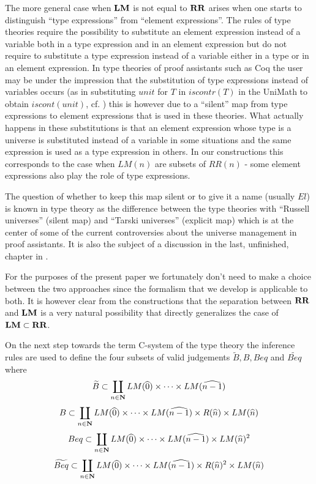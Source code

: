 \documentclass[11pt]{article}
\newcommand{\nn}{{\bf N\rm}}
\newcommand{\nat}{\nn}
\newcommand{\wt}{\widetilde}
\newcommand{\wh}{\widehat}
\newcommand{\RR}{{\bf RR}}
\newcommand{\LM}{{\bf LM}}
\begin{document}
The more general case when $\LM$ is not equal to $\RR$ arises when one starts to distinguish ``type expressions'' from ``element expressions''. The rules of type theories require the possibility to substitute an element expression instead of a variable both in a type expression and in an element expression but do not require to substitute a type expression instead of a variable either in a type or in an element expression. In type theories of proof assistants such as Coq the user may be under the impression that the substitution of type expressions instead of variables occurs (as in substituting $unit$ for $T$ in $iscontr(T)$ in the UniMath to obtain $iscont(unit)$, cf. \cite{UniMath2015}) this is however due to a ``silent'' map from type expressions to element expressions that is used in these theories. What actually happens in these substitutions is that an element expression whose type is a universe is substituted instead of a variable in some situations and the same expression is used as a type expression in others. In our constructions this corresponds to the case when $LM(n)$ are subsets of $RR(n)$ - some element expressions also play the role of type expressions. 

The question of whether to keep this map silent or to give it a name (usually $El$) is known in type theory as the difference between the type theories with ``Russell universes'' (silent map) and ``Tarski universes'' (explicit map) which is at the center of some of the current controversies about the universe management in proof assistants. It is also the subject of a discussion in the last, unfinished, chapter in \cite{Bibliopolis}. 

For the purposes of the present paper we fortunately don't need to make a choice between the two approaches since the formalism that we develop is applicable to both. It is however clear from the constructions that the separation between $\RR$ and $\LM$ is a very natural possibility that directly generalizes the case of $\LM\subset \RR$. 

On the next step towards the term C-system of the type theory the inference rules are used to define the four subsets of valid judgements ${\wt{B}},{B},{Beq}$ and ${\wt{Beq}}$ where 
%
$${\wt{B}} \subset \coprod_{n\in\nat} LM(\wh{0})\times\dots\times LM(\wh{n-1})$$
$${B}\subset  \coprod_{n\in\nat} LM(\wh{0})\times\dots\times LM(\wh{n-1})\times R(\wh{n})\times LM(\wh{n})$$
$${Beq} \subset \coprod_{n\in\nat} LM(\wh{0})\times\dots\times LM(\wh{n-1})\times LM(\wh{n})^2$$
$${\wt{Beq}} \subset \coprod_{n\in\nat} LM(\wh{0})\times\dots\times LM(\wh{n-1})\times R(\wh{n})^2\times LM(\wh{n})$$ 
%
\end{document}
